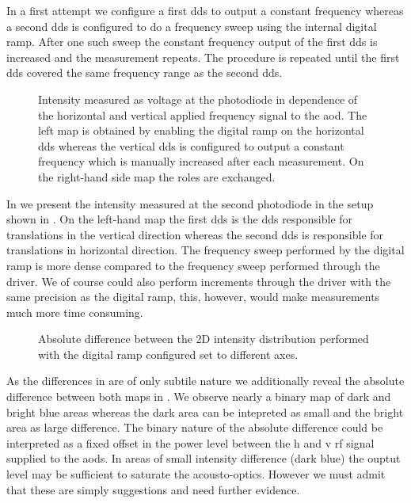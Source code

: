 In a first attempt we configure a first \gls{dds} to output a constant
frequency whereas a second \gls{dds} is configured to do a frequency sweep
using the internal digital ramp. After one such sweep the constant frequency
output of the first \gls{dds} is increased and the measurement repeats. The
procedure is repeated until the first \gls{dds} covered the same frequency
range as the second \gls{dds}.
\begin{figure}[htb]
  \centering
  \begin{adjustbox}{width=\textwidth}
  \end{adjustbox}
  \caption{Intensity measured as voltage at the photodiode in dependence of
    the horizontal and vertical applied frequency signal to the \gls{aod}. The
    left map is obtained by enabling the digital ramp on the horizontal
    \gls{dds} whereas the vertical \gls{dds} is configured to output a
    constant frequency which is manually increased after each measurement.
    On the right-hand side map the roles are exchanged.
  }\label{fig:intensity_distribution_frequency}
\end{figure}
In  we present the intensity
measured at the second photodiode in the setup shown in
. On the left-hand map the first
\gls{dds} is the \gls{dds} responsible for translations in the vertical
direction whereas the second \gls{dds} is responsible for translations in
horizontal direction. The frequency sweep performed by the digital ramp is
more dense compared to the frequency sweep performed through the driver. We
of course could also perform increments through the driver with the same
precision as the digital ramp, this, however, would make measurements much
more time consuming.
\begin{figure}[htb]
  \centering
  \begin{adjustbox}{width=\textwidth}
  \end{adjustbox}
  \caption{Absolute difference between the 2D intensity distribution
    performed with the digital ramp configured set to different axes.
  }\label{fig:intensity_distribution_frequency_residue}
\end{figure}
As the differences in  are of only
subtile nature we additionally reveal the absolute difference between both
maps in . We observe
nearly a binary map of dark and bright blue areas whereas the dark area can
be intepreted as small and the bright area as large difference. The binary
nature of the absolute difference could be interpreted as a fixed offset
in the power level between the \gls{h} and \gls{v} \gls{rf} signal supplied to
the \gls{aod}s. In areas of small intensity difference (dark blue) the ouptut
level may be sufficient to saturate the acousto-optics. However we must admit
that these are simply suggestions and need further evidence.

